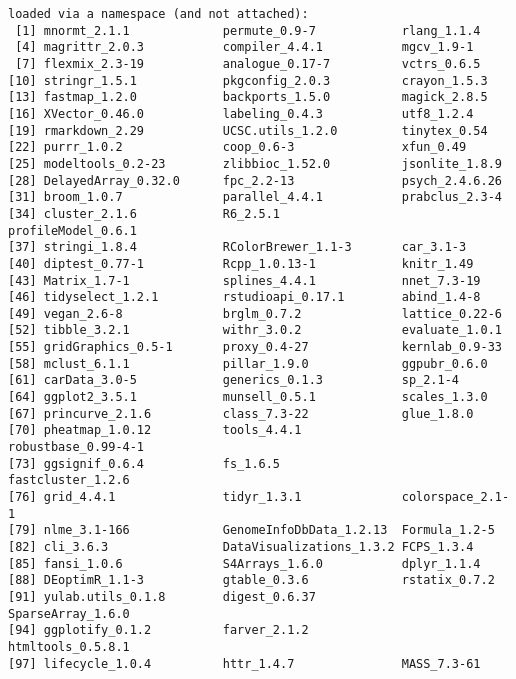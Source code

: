 \documentclass[
  letterpaper,
  DIV=11,
  numbers=noendperiod]{scrreprt}
\begin{document}
\begin{verbatim}
loaded via a namespace (and not attached):
 [1] mnormt_2.1.1             permute_0.9-7            rlang_1.1.4             
 [4] magrittr_2.0.3           compiler_4.4.1           mgcv_1.9-1              
 [7] flexmix_2.3-19           analogue_0.17-7          vctrs_0.6.5             
[10] stringr_1.5.1            pkgconfig_2.0.3          crayon_1.5.3            
[13] fastmap_1.2.0            backports_1.5.0          magick_2.8.5            
[16] XVector_0.46.0           labeling_0.4.3           utf8_1.2.4              
[19] rmarkdown_2.29           UCSC.utils_1.2.0         tinytex_0.54            
[22] purrr_1.0.2              coop_0.6-3               xfun_0.49               
[25] modeltools_0.2-23        zlibbioc_1.52.0          jsonlite_1.8.9          
[28] DelayedArray_0.32.0      fpc_2.2-13               psych_2.4.6.26          
[31] broom_1.0.7              parallel_4.4.1           prabclus_2.3-4          
[34] cluster_2.1.6            R6_2.5.1                 profileModel_0.6.1      
[37] stringi_1.8.4            RColorBrewer_1.1-3       car_3.1-3               
[40] diptest_0.77-1           Rcpp_1.0.13-1            knitr_1.49              
[43] Matrix_1.7-1             splines_4.4.1            nnet_7.3-19             
[46] tidyselect_1.2.1         rstudioapi_0.17.1        abind_1.4-8             
[49] vegan_2.6-8              brglm_0.7.2              lattice_0.22-6          
[52] tibble_3.2.1             withr_3.0.2              evaluate_1.0.1          
[55] gridGraphics_0.5-1       proxy_0.4-27             kernlab_0.9-33          
[58] mclust_6.1.1             pillar_1.9.0             ggpubr_0.6.0            
[61] carData_3.0-5            generics_0.1.3           sp_2.1-4                
[64] ggplot2_3.5.1            munsell_0.5.1            scales_1.3.0            
[67] princurve_2.1.6          class_7.3-22             glue_1.8.0              
[70] pheatmap_1.0.12          tools_4.4.1              robustbase_0.99-4-1     
[73] ggsignif_0.6.4           fs_1.6.5                 fastcluster_1.2.6       
[76] grid_4.4.1               tidyr_1.3.1              colorspace_2.1-1        
[79] nlme_3.1-166             GenomeInfoDbData_1.2.13  Formula_1.2-5           
[82] cli_3.6.3                DataVisualizations_1.3.2 FCPS_1.3.4              
[85] fansi_1.0.6              S4Arrays_1.6.0           dplyr_1.1.4             
[88] DEoptimR_1.1-3           gtable_0.3.6             rstatix_0.7.2           
[91] yulab.utils_0.1.8        digest_0.6.37            SparseArray_1.6.0       
[94] ggplotify_0.1.2          farver_2.1.2             htmltools_0.5.8.1       
[97] lifecycle_1.0.4          httr_1.4.7               MASS_7.3-61             
\end{verbatim}
\end{document}

